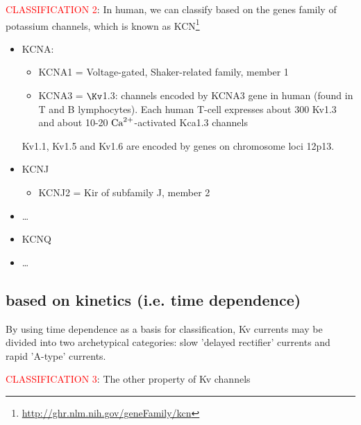 \textcolor{red}{CLASSIFICATION 2}: In human, we can classify based on the genes
family of potassium channels, which is known as
KCN\footnote{\url{http://ghr.nlm.nih.gov/geneFamily/kcn}}
\begin{itemize}
  
  \item KCNA: 
\begin{itemize}
  \item KCNA1 = Voltage-gated, Shaker-related family, member 1
  \item KCNA3 = $\Kv$1.3: channels encoded by KCNA3 gene in human (found in T
 and B lymphocytes). Each human T-cell expresses about 300 Kv1.3 and about 10-20
${\text{Ca}^{2+}}$-activated Kca1.3 channels
\end{itemize}

Kv1.1, Kv1.5 and Kv1.6 are encoded by genes on chromosome loci 12p13.

  \item KCNJ

\begin{itemize}
  \item KCNJ2 = Kir of subfamily J, member 2
\end{itemize}

  \item \ldots


  \item KCNQ

\item \ldots
\end{itemize}

\subsection{based on kinetics (i.e. time dependence)}
\label{sec:K+-channel-classification-kinetics}
\label{sec:nomenclature-K_channel-based-kinetics}

By using time dependence as a basis for classification, Kv currents may be
divided into two archetypical categories: slow 'delayed rectifier' currents and
rapid 'A-type' currents.

\textcolor{red}{CLASSIFICATION 3}: The other property of Kv channels 

